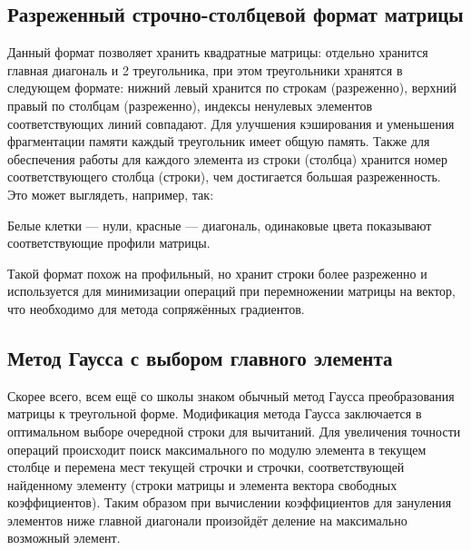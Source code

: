 \documentclass[russian, english]{article}
\begin{document}
\subsection{Разреженный строчно-столбцевой формат матрицы}
Данный формат позволяет хранить квадратные матрицы: отдельно хранится главная диагональ и 2 треугольника, при этом треугольники хранятся в следующем формате: нижний левый хранится по строкам (разреженно), верхний правый по столбцам (разреженно), индексы ненулевых элементов соответствующих линий совпадают. Для улучшения кэширования и уменьшения фрагментации памяти каждый треугольник имеет общую память. Также для обеспечения работы для каждого элемента из строки (столбца) хранится номер соответствующего столбца (строки), чем достигается большая разреженность.\\
Это может выглядеть, например, так:
\begin{center}
\end{center}
Белые клетки --- нули, красные --- диагональ, одинаковые цвета показывают соответствующие профили матрицы.\par
Такой формат похож на профильный, но хранит строки более разреженно и используется для минимизации операций при перемножении матрицы на вектор, что необходимо для метода сопряжённых градиентов.
\subsection{Метод Гаусса с выбором главного элемента}
Скорее всего, всем ещё со школы знаком обычный метод Гаусса преобразования матрицы к треугольной форме. Модификация метода Гаусса заключается в оптимальном выборе очередной строки для вычитаний. Для увеличения точности операций происходит поиск максимального по модулю элемента в текущем столбце и перемена мест текущей строчки и строчки, соответствующей найденному элементу (строки матрицы и элемента вектора свободных коэффициентов). Таким образом при вычислении коэффициентов для зануления элементов ниже главной диагонали произойдёт деление на максимально возможный элемент.
\end{document}
